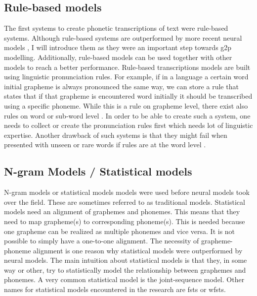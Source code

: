 \subsection{Rule-based models}
The first systems to create phonetic transcriptions of text were rule-based systems. Although rule-based systems are outperformed by more recent neural models \citep{Ashby-Bartley.2021, gorman-etal-2020-sigmorphon}, I will introduce them as they were an important step towards \ac{g2p} modelling. Additionally, rule-based models can be used together with other models to reach a better performance. Rule-based transcriptions models are built using linguistic pronunciation rules. For example, if in a language a certain word initial grapheme is always pronounced the same way, we can store a rule that states that if that grapheme is encountered word initially it should be transcribed using a specific phoneme. While this is a rule on grapheme level, there exist also rules on word or sub-word level \citep{mortensen-etal-2018-epitran}. In order to be able to create such a system, one needs to collect or create the pronunciation rules first which needs lot of linguistic expertise. Another drawback of such systems is that they might fail when presented with unseen or rare words if rules are at the word level \citep{ney-joint-sequence2008}.

\subsection{N-gram Models / Statistical models}
N-gram models or statistical models models were used before neural models took over the field. These are sometimes referred to as traditional models. Statistical models need an alignment of graphemes and phonemes. This means that they need to map grapheme(s) to corresponding phoneme(s). This is needed because one grapheme can be realized as multiple phonemes and vice versa. It is not possible to simply have a one-to-one alignment. The necessity of grapheme-phoneme alignment is one reason why statistical models were outperformed by neural models. The main intuition about statistical models is that they, in some way or other, try to statistically model the relationship between graphemes and phonemes. A very common statistical model is the joint-sequence model. Other names for statistical models encountered in the research are \acp{fst} or \acp{wfst}.

